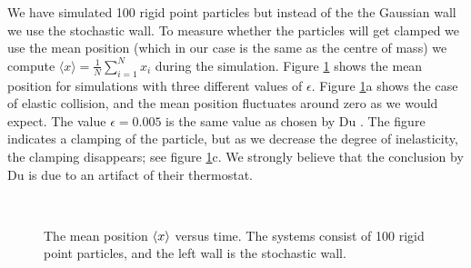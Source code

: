 We have simulated 100 rigid point particles but instead of the the
Gaussian wall we use the stochastic wall. To measure whether the
particles will get clamped we use the mean position (which in our case is
the same as the centre of mass) \ie we compute $\langle x \rangle =
\frac{1}{N} \sum_{i=1}^N x_i$ during the simulation. Figure
\ref{fig:COM} shows the mean position for simulations with three
different values of $\epsilon$. Figure \ref{fig:COM}a shows the case
of elastic collision, and the mean position fluctuates around zero as
we would expect. The value $\epsilon = 0.005$ is the same value as
chosen by Du \etal \cite{Du95}. The figure indicates a clamping of the
particle, but as we decrease the degree of inelasticity, the clamping
disappears; see figure \ref{fig:COM}c. We strongly believe that the
conclusion by Du \etal is due to an artifact of their thermostat.

\begin{figure}
  \centering
  \mbox{
    \quad
    \quad
    }
  \caption[Breakdown of hydrodynamics]{The mean position
    \protect$\langle x \rangle\protect$ versus 
    time. The systems consist of 100 rigid point particles, and the
    left wall is the stochastic wall.}
  \label{fig:COM}
\end{figure}
